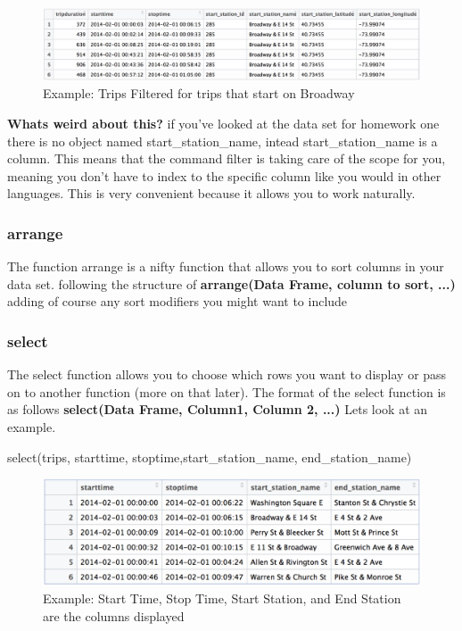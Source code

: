\documentclass{article}
\begin{document}
\begin{figure}[H]
    \centering
    \includegraphics[width=.75\textwidth]{filter_trips_ex.png}
    \caption{Example: Trips Filtered for trips that start on Broadway}
    \label{fig:filter_trips_ex}
\end{figure}

\begin{flushleft}
\textbf{Whats weird about this?} if you've looked at the data set for homework one there is no object named start\_station\_name, intead start\_station\_name is a column. This means that the command filter is taking care of the scope for you, meaning you don't have to index to the specific column like you would in other languages. This is very convenient because it allows you to work naturally.
\end{flushleft}

\subsubsection{arrange}
\begin{flushleft}
The function arrange is a nifty function that allows you to sort columns in your data set. following the structure of \textbf{arrange(Data Frame, column to sort, ...)} adding of course any sort modifiers you might want to include
\end{flushleft}


\subsubsection{select}
\begin{flushleft}
The select function allows you to choose which rows you want to display or pass on to another function (more on that later). The format of the select function is as follows \textbf{select(Data Frame, Column1, Column 2, ...)} Lets look at an example.
\end{flushleft}

\begin{center}
select(trips, starttime, stoptime,start\_station\_name, end\_station\_name)
\end{center}

\begin{figure}[H]
    \centering
    \includegraphics[width=.75\textwidth]{select_trips_ex.PNG}
    \caption{Example: Start Time, Stop Time, Start Station, and End Station are the columns displayed}
    \label{fig:select_trips_ex}
\end{figure}
\end{document}
